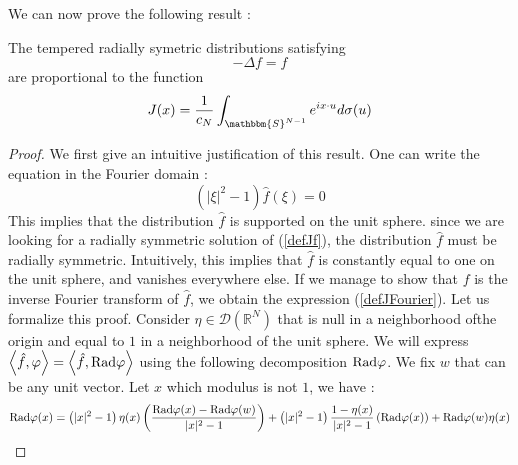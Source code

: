 \documentclass[11pt,a4paper]{article}
\begin{document}
We can now prove the following result : 
\begin{The}\label{TheoStyle} The tempered radially symetric distributions satisfying  \begin{equation}
- \Delta f = f
\label{defJf}
\end{equation}
are proportional to the function \begin{equation}
J(x) = \frac{1}{c_N}\int_{\mathbbm{S}^{N-1}} e^{ix \cdot u}d\sigma(u)
\label{defJFourier}
\end{equation} 
\begin{proof}
We first give an intuitive justification of this result. One can write the equation in the Fourier domain : 
\begin{equation}
\left(|\xi|^2-1\right)\hat{f}(\xi) = 0
\end{equation}
This implies that the distribution $\hat{f}$ is supported on the unit sphere. since we are looking for a radially symmetric solution of (\ref{defJf}), the distribution $\hat{f}$ must be radially symmetric. Intuitively, this implies that $\hat{f}$ is constantly equal to one on the unit sphere, and vanishes everywhere else. If we manage to show that $f$ is the inverse Fourier transform of $\hat{f}$, we obtain the expression (\ref{defJFourier}). Let us formalize this proof. Consider $\eta \in \mathcal{D}(\mathbb{R}^N)$ that is null in a neighborhood ofthe origin and equal to $1$ in a neighborhood of the unit sphere. We will express $\left\langle \hat{f},\varphi\right\rangle = \left\langle \hat{f},\textup{Rad}\varphi\right\rangle$ using the following decomposition $\textup{Rad}\varphi$. We fix $w$ that can be any unit vector. Let $x$ which modulus is not $1$, we have : 
\[\textup{Rad}\varphi(x) = \left(|x|^2 - 1\right)\eta(x)\left(\frac{\textup{Rad}\varphi(x) - \textup{Rad}\varphi(w)}{|x|^2 - 1}\right) + \left(|x|^2 - 1\right)\frac{1-\eta(x)}{|x|^2 - 1}\left(\textup{Rad}\varphi(x)\right) + \textup{Rad}\varphi(w)\eta(x)\]

\end{proof}
\end{The}
\end{document}
